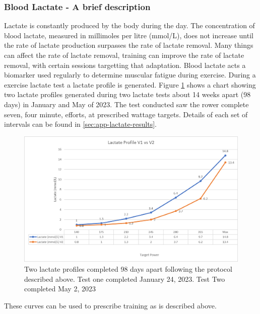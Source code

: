 \subsubsection{Blood Lactate - A brief description}
Lactate is constantly produced by the body during the day. The concentration of blood lactate, measured in millimoles per litre (mmol/L), does not increase until the rate of lactate production surpasses the rate of lactate removal. Many things can affect the rate of lactate removal, training can improve the rate of lactate removal, with certain sessions targetting that adaptation. Blood lactate acts a biomarker used regularly to determine muscular fatigue during exercise. During a exercise lactate test a lactate profile is generated. Figure \ref{fig:lactateGraph} shows a chart showing two lactate profiles generated during two lactate tests about 14 weeks apart (98 days) in January and May of 2023. The test conducted saw the rower complete seven, four minute, efforts, at prescribed wattage targets. Details of each set of intervals can be found in \ref{sec:app-lactate-results}.
\begin{figure}
  \centering
  \includegraphics[width=\linewidth]{figures/lactateGraph.png}
  \caption[Lactate Profiles from January and May 2023]{Two lactate profiles completed 98 days apart following the protocol described above. Test one completed January 24, 2023. Test Two completed May 2, 2023}
  \label{fig:lactateGraph}
\end{figure}
These curves can be used to prescribe training as is described above.

